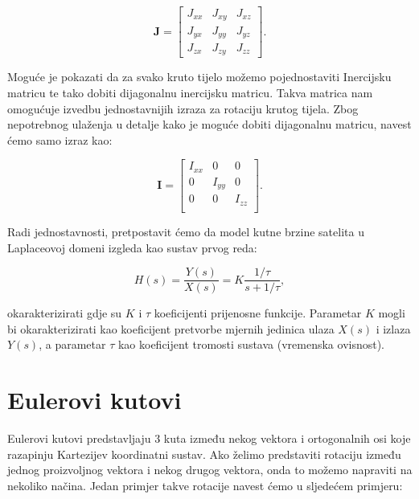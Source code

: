 \documentclass[times, utf8, diplomski, numeric]{templates/template}
\begin{document}
{{        \begin{equation}
        \boldsymbol{J} = 
        \begin{bmatrix}
            J_{xx} & J_{xy} & J_{xz} \\
            J_{yx} & J_{yy} & J_{yz} \\
            J_{zx} & J_{zy} & J_{zz}
        \end{bmatrix}
        .
        \end{equation}

        Moguće je pokazati da za svako kruto tijelo možemo pojednostaviti Inercijsku matricu te tako dobiti dijagonalnu inercijsku matricu. Takva matrica nam omogućuje izvedbu jednostavnijih izraza za rotaciju krutog tijela. Zbog nepotrebnog ulaženja u detalje kako je moguće dobiti dijagonalnu matricu, navest ćemo samo izraz kao:

        \begin{equation}
        \boldsymbol{I} = 
        \begin{bmatrix}
            I_{xx} & 0      & 0 \\
            0      & I_{yy} & 0 \\
            0      & 0      & I_{zz} \\
        \end{bmatrix}
        .
        \end{equation}

        Radi jednostavnosti, pretpostavit ćemo da model kutne brzine satelita u Laplaceovoj domeni izgleda kao sustav prvog reda:
        
        \begin{equation}
        \label{eq:laplace_prvi_red}
        H(s) = \frac{Y(s)}{X(s)} = K \frac{1/\tau}{s + 1/\tau},
        \end{equation}

okarakterizirati
        gdje su $K$ i $\tau$ koeficijenti prijenosne funkcije. Parametar $K$ mogli bi okarakterizirati kao koeficijent pretvorbe mjernih jedinica ulaza $X(s)$ i izlaza $Y(s)$, a parametar $\tau$ kao koeficijent tromosti sustava (vremenska ovisnost).
    }

    \section{Eulerovi kutovi}{
        Eulerovi kutovi predstavljaju 3 kuta između nekog vektora i ortogonalnih osi koje razapinju Kartezijev koordinatni sustav. Ako želimo predstaviti rotaciju između jednog proizvoljnog vektora i nekog drugog vektora, onda to možemo napraviti na nekoliko načina. Jedan primjer takve rotacije navest ćemo u sljedećem primjeru:

}}
\end{document}
